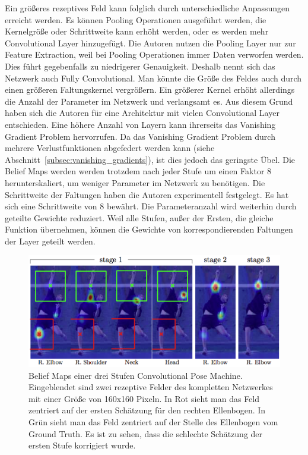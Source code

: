 \documentclass[journal, a4paper]{IEEEtran}
\begin{document}
        Ein größeres rezeptives Feld kann folglich durch unterschiedliche Anpassungen erreicht werden. Es können Pooling Operationen ausgeführt werden, die Kernelgröße oder Schrittweite kann erhöht werden, oder es werden mehr Convolutional Layer hinzugefügt.
        Die Autoren nutzen die Pooling Layer nur zur Feature Extraction, weil bei Pooling Operationen immer Daten verworfen werden. Dies führt gegebenfalls zu niedrigerer Genauigkeit. Deshalb nennt sich das Netzwerk auch Fully Convolutional. Man könnte die Größe des Feldes auch durch einen größeren Faltungskernel vergrößern. Ein größerer Kernel erhöht allerdings die Anzahl der Parameter im Netzwerk und verlangsamt es. 
        Aus diesem Grund haben sich die Autoren für eine Architektur mit vielen Convolutional Layer entschieden. Eine höhere Anzahl von Layern kann ihrerseits das Vanishing Gradient Problem hervorrufen. Da das Vanishing Gradient Problem durch mehrere Verlustfunktionen abgefedert werden kann (siehe Abschnitt~\ref{subsec:vanishing_gradients}), ist dies jedoch das geringste Übel. Die Belief Maps werden werden trotzdem nach jeder Stufe um einen Faktor 8 herunterskaliert, um weniger Parameter im Netzwerk zu benötigen. Die Schrittweite der Faltungen haben die Autoren experimentell festgelegt. Es hat sich eine Schrittweite von 8 bewährt. Die Parameteranzahl wird weiterhin durch geteilte Gewichte reduziert. Weil alle Stufen, außer der Ersten, die gleiche Funktion übernehmen, können die Gewichte von korrespondierenden Faltungen der Layer geteilt werden.

        \begin{figure}[!hbt]
                \begin{center}
                \includegraphics[width=1\columnwidth]{receptive_field.png}
                \caption{Belief Maps einer drei Stufen Convolutional Pose Machine. Eingeblendet sind zwei rezeptive Felder des kompletten Netzwerkes mit einer Größe von 160x160 Pixeln. In Rot sieht man das Feld zentriert auf der ersten Schätzung für den rechten Ellenbogen. In Grün sieht man das Feld zentriert auf der Stelle des Ellenbogen vom Ground Truth. Es ist zu sehen, dass die schlechte Schätzung der ersten Stufe korrigiert wurde.}
                \label{fig:receptive_field}
                \end{center}
        \end{figure}
\end{document}
